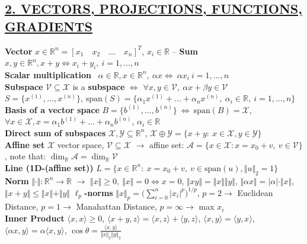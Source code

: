 \documentclass[a4paper]{article}
\begin{document}
\subsection*{\color{cyan} 
\textsf{\underline{2. VECTORS, PROJECTIONS, FUNCTIONS, GRADIENTS}}}
\textbf{Vector} $x \in \mathbb{R}^n = [x_1 \quad x_2 \quad ... \quad x_n]^T$, $x_i\in\mathbb{R}$ -- 
\textbf{Sum} $x, y \in \mathbb{R}^n, x+y \iff x_i+y_i, \ i=1,...,n$\\
\textbf{Scalar multiplication} \ $\alpha \in \mathbb{R}, x \in \mathbb{R}^n, \ \alpha x \iff \ \alpha{x_i} \ i=1,...,n $\\
\textbf{Subspace} $\mathcal{V} \subseteq \mathcal{X}$ is a \textbf{subspace} $\iff$ $\forall x, y \in \mathcal{V}, \ \alpha{x}+\beta{y}\in\mathcal{V}$\\
$S=\{x^{(1)},...,x^{(n)}\}$, $\text{span}(S)=\{\alpha_1{x^{(1)}}+...+\alpha_n{x^{(n)}}, \ \alpha_i \in \mathbb{R}, \ i=1,...,n\}$\\
\textbf{Basis of a vector space} $B=\{b^{(1)}, ..., b^{(n)}\} \ \iff \ \text{span}(B)=\mathcal{X}$, $\forall x \in \mathcal{X}, x=\alpha_1{b^{(1)}+...+\alpha_n{b^{(n)}}}$, $\alpha_i\in\mathbb{R}$\\
\textbf{Direct sum of subspaces} $\mathcal{X,Y}\subseteq \mathbb{R}^n$, $\mathcal{X} \oplus \mathcal{Y}=\{x+y: \ x\in\mathcal{X}, y\in\mathcal{Y}\}$\\
\textbf{Affine set} $\mathcal{X}$ vector space, $\mathcal{V}\subseteq\mathcal{X}$ $\to$ affine set: $\mathcal{A}=\{x\in\mathcal{X}: x=x_0+v, \ v\in\mathcal{V}\}$, note that: $\dim_{\mathbb{R}}{\mathcal{A}}=\dim_{\mathbb{R}}{\mathcal{V}}$\\
\textbf{Line (1D-(affine set))} $L=\{x\in\mathbb{R}^n: \ x=x_0+v, \ v \in \text{span}(u), \Vert u \Vert_2=1\}$\\
\textbf{Norm} $\Vert \cdot \Vert: \mathbb{R}^n \to \mathbb{R}$ $\to$ $\Vert x \Vert \ge 0, \ \Vert x \Vert = 0 \iff x=0 $, 
$\Vert xy \Vert = \Vert x \Vert \Vert y \Vert$, $\Vert \alpha{x} \Vert =\vert \alpha \vert \cdot \Vert x \Vert$, 
$\Vert x+y \Vert \le \Vert x \Vert + \Vert y \Vert$ 
\textbf{$\ell_p$-norms} $\Vert x \Vert_p = \biggl(
    \sum_{i=0}^n{\vert x_i \vert}^p
\biggr)^{1/p}$, $p=2 \to $ Euclidean Distance, $p=1 \to$ Manahattan Distance, $p=\infty\to$ max $x_i$\\
\textbf{Inner Product}  $\langle x,x \rangle \ge 0$, $\langle x+y, z \rangle = \langle x,z \rangle + \langle y,z\rangle$, $\langle x,y\rangle=\langle y,x \rangle$, $\langle \alpha{x}, y \rangle=\alpha{\langle x,y \rangle }$, $\cos\theta=\frac{\langle{x,y}\rangle}{\Vert{x}\Vert_2 \Vert{y}\Vert_2 }$ \\
\end{document}
